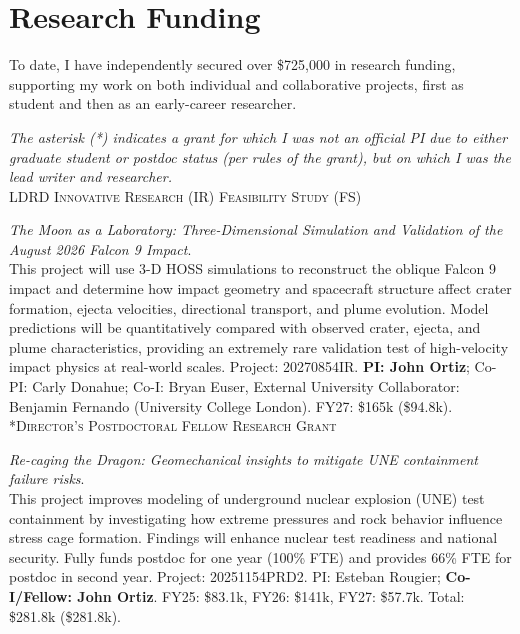 \documentclass[11pt, letterpaper]{article}
\newcommand{\years}[1]{\marginnote{\scriptsize #1}}
\begin{document}
\section*{Research Funding}
\label{sec:funding}
\noindent
To date,  I have independently secured over \$725,000 in research funding,
supporting my work on both individual and collaborative projects, first as 
student and then as an early-career researcher.

\emph{The asterisk (*) indicates a grant for which I was not an official PI due
to either graduate student or postdoc status (per rules of the grant), but on
which I was the lead writer and researcher.}\\

\years{2026}\textsc{LDRD Innovative Research (IR) Feasibility Study (FS)}

    \textit{ The Moon as a Laboratory: Three-Dimensional Simulation and Validation of the August 2026 Falcon 9 Impact}.\\ 
    This project will use 3-D HOSS simulations to reconstruct the oblique Falcon 9
    impact and determine how impact geometry and spacecraft structure affect crater
    formation, ejecta velocities, directional transport, and plume evolution. Model
    predictions will be quantitatively compared with observed crater, ejecta, and
    plume characteristics, providing an extremely rare validation test of
    high-velocity impact physics at real-world scales.
    Project: 20270854IR.  \textbf{PI: John Ortiz}; Co-PI: Carly Donahue; Co-I:
    Bryan Euser, External University Collaborator: Benjamin Fernando
    (University College London). FY27: \$165k (\$94.8k).\\


\years{2025}\textsc{*Director's Postdoctoral Fellow Research Grant} 

    \textit{Re-caging the Dragon: Geomechanical insights to mitigate UNE
    containment failure risks}.\\ This project improves modeling of underground
    nuclear explosion (UNE) test containment by investigating how extreme
    pressures and rock behavior influence stress cage formation. Findings will
    enhance nuclear test readiness and national security. Fully funds postdoc
    for one year (100\% FTE) and provides 66\% FTE for postdoc in second year.
    Project: 20251154PRD2.  PI: Esteban Rougier; \textbf{Co-I/Fellow: John
    Ortiz}.  FY25: \$83.1k, FY26: \$141k, FY27: \$57.7k. Total: \$281.8k
    (\$281.8k).\\
\end{document}

